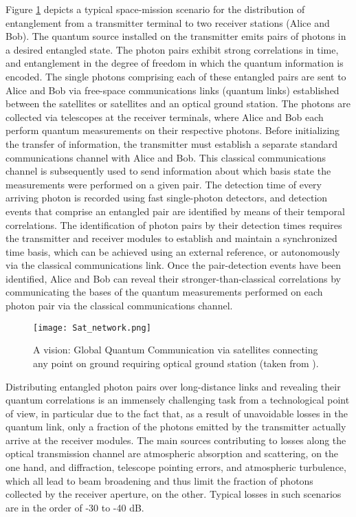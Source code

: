 \documentclass{article}
\begin{document}
Figure \ref{fig:network} depicts a typical space-mission scenario for the distribution of entanglement from a transmitter terminal to two receiver stations (Alice and Bob). The quantum source installed on the transmitter emits pairs of photons in a desired entangled state. The photon pairs exhibit strong correlations in time, and entanglement in the degree of freedom in which the quantum information is encoded. The single photons comprising each of these entangled pairs are sent to Alice and Bob via free-space communications links (quantum links) established between the satellites or satellites and an optical ground station. The photons are collected via telescopes at the receiver terminals, where Alice and Bob each perform quantum measurements on their respective photons. Before initializing the transfer of information, the transmitter must establish a separate standard communications channel with Alice and Bob. This classical communications channel is subsequently used to send information about which basis state the measurements were performed on a given pair. The detection time of every arriving photon is recorded using fast single-photon detectors, and detection events that comprise an entangled pair are identified by means of their temporal correlations. The identification of photon pairs by their detection times requires the transmitter and receiver modules to establish and maintain a synchronized time basis, which can be achieved using an external reference, or autonomously via the classical communications link. Once the pair-detection events have been identified, Alice and Bob can reveal their stronger-than-classical correlations by communicating the bases of the quantum measurements performed on each photon pair via the classical communications channel. 

\begin{figure}[h!]
\centering
\texttt{[image: Sat\_network.png]}
\caption{A vision: Global Quantum Communication via satellites connecting any point on ground requiring optical ground station (taken from \cite{ursin2009space}).}
\label{fig:network}
\end{figure}

Distributing entangled photon pairs over long-distance links and revealing their quantum correlations is an immensely challenging task from a technological point of view, in particular due to the fact that, as a result of unavoidable losses in the quantum link, only a fraction of the photons emitted by the transmitter actually arrive at the receiver modules. The main sources contributing to losses along the optical transmission channel are atmospheric absorption and scattering, on the one hand, and diffraction, telescope pointing errors, and atmospheric turbulence, which all lead to beam broadening and thus limit the fraction of photons collected by the receiver aperture, on the other. Typical losses in such scenarios are in the order of -30 to -40 dB.
\end{document}
